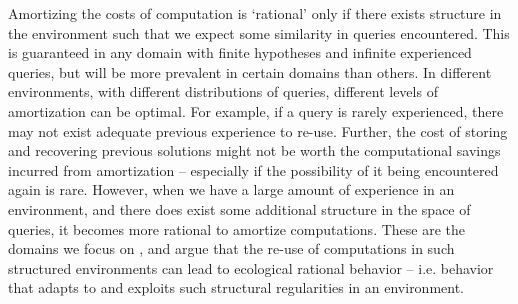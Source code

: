 Amortizing the costs of computation is `rational' only if there exists structure in the environment  such that we expect some similarity in queries encountered. This is guaranteed in any domain with finite hypotheses and infinite experienced queries, but will be more prevalent in certain domains than others. In different environments, with different distributions of queries, different levels of amortization can be optimal. For example, if a query is rarely experienced, there may not exist adequate previous experience to re-use. Further, the cost of storing and recovering previous solutions might not be worth the computational savings incurred from amortization -- especially if the possibility of it being encountered again is rare. However, when we have a large amount of experience in an environment, and there does exist some additional structure in the space of queries, it becomes more rational to amortize computations. These are the domains we focus on
, and argue that the re-use of computations in such structured environments can lead to ecological rational behavior -- i.e. behavior that adapts to and exploits such structural regularities in an environment. 

